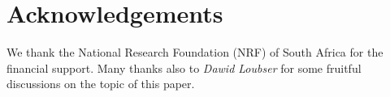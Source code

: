 \section{Acknowledgements}
We thank the National Research Foundation (NRF) of South Africa for the financial support. Many thanks also to {\it Dawid Loubser} for some fruitful discussions on the topic of this paper.
